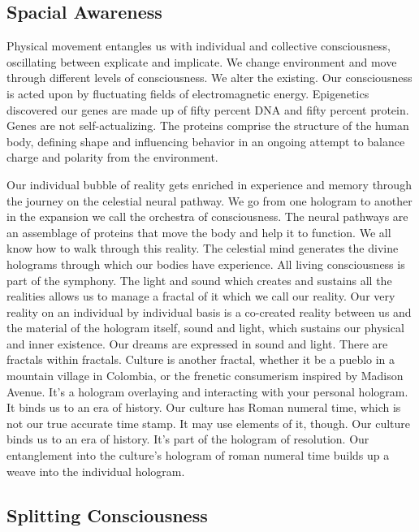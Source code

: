 \subsection{Spacial Awareness}\label{spacial-awareness}

Physical movement entangles us with individual and collective
consciousness, oscillating between explicate and implicate. We change
environment and move through different levels of consciousness. We alter
the existing. Our consciousness is acted upon by fluctuating fields of
electromagnetic energy. Epigenetics discovered our genes are made up of
fifty percent DNA and fifty percent protein. Genes are not
self-actualizing. The proteins comprise the structure of the human body,
defining shape and influencing behavior in an ongoing attempt to balance
charge and polarity from the environment.

Our individual bubble of reality gets enriched in experience and memory
through the journey on the celestial neural pathway. We go from one
hologram to another in the expansion we call the orchestra of
consciousness. The neural pathways are an assemblage of proteins that
move the body and help it to function. We all know how to walk through
this reality. The celestial mind generates the divine holograms through
which our bodies have experience. All living consciousness is part of
the symphony. The light and sound which creates and sustains all the
realities allows us to manage a fractal of it which we call our reality.
Our very reality on an individual by individual basis is a co-created
reality between us and the material of the hologram itself, sound and
light, which sustains our physical and inner existence. Our dreams are
expressed in sound and light. There are fractals within fractals.
Culture is another fractal, whether it be a pueblo in a mountain village
in Colombia, or the frenetic consumerism inspired by Madison Avenue.
It's a hologram overlaying and interacting with your personal hologram.
It binds us to an era of history. Our culture has Roman numeral time,
which is not our true accurate time stamp. It may use elements of it,
though. Our culture binds us to an era of history. It's part of the
hologram of resolution. Our entanglement into the culture's hologram of
roman numeral time builds up a weave into the individual hologram.

\subsection{Splitting Consciousness}\label{splitting-consciousness}

